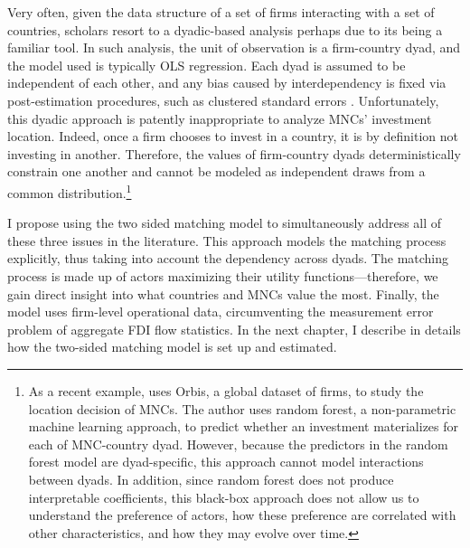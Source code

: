 Very often, given the data structure of a set of firms interacting with a set of
countries, scholars resort to a dyadic-based analysis perhaps due to its being a
familiar tool. In such analysis, the unit of observation is a firm-country dyad,
and the model used is typically OLS regression. Each dyad is assumed to be
independent of each other, and any bias caused by interdependency is fixed via
post-estimation procedures, such as clustered standard errors \citep{Dorff2013}.
Unfortunately, this dyadic approach is patently inappropriate to analyze MNCs'
investment location. Indeed, once a firm chooses to invest in a country, it is
by definition not investing in another. Therefore, the values of firm-country
dyads deterministically constrain one another and cannot be modeled as
independent draws from a common distribution.\footnote{As a recent example,
  \citet{Arel-Bundock2017} uses Orbis, a global dataset of firms, to study the
  location decision of MNCs. The author uses random forest, a non-parametric
  machine learning approach, to predict whether an investment materializes for
  each of MNC-country dyad. However, because the predictors in the random forest
  model are dyad-specific, this approach cannot model interactions between
  dyads. In addition, since random forest does not produce interpretable
  coefficients, this black-box approach does not allow us to understand the
  preference of actors, how these preference are correlated with other
  characteristics, and how they may evolve over time.}

I propose using the two sided matching model to simultaneously address all of
these three issues in the literature. This approach models the matching process
explicitly, thus taking into account the dependency across dyads. The matching
process is made up of actors maximizing their utility functions---therefore, we
gain direct insight into what countries and MNCs value the most. Finally, the
model uses firm-level operational data, circumventing the measurement error
problem of aggregate FDI flow statistics. In the next chapter, I describe in
details how the two-sided matching model is set up and estimated.

